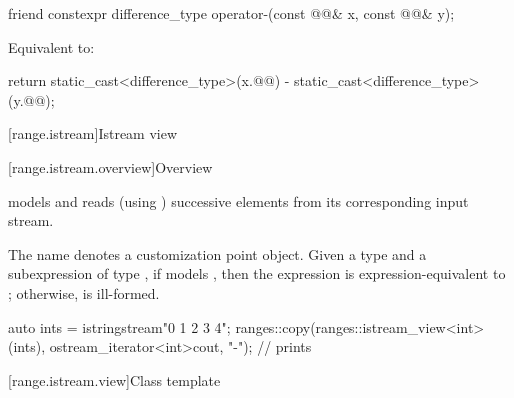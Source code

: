%
\begin{itemdecl}
friend constexpr difference_type operator-(const @@& x, const @@& y);
\end{itemdecl}

\begin{itemdescr}
\pnum
\effects
Equivalent to:
\begin{codeblock}
return static_cast<difference_type>(x.@@) - static_cast<difference_type>(y.@@);
\end{codeblock}
\end{itemdescr}

[range.istream]{Istream view}

[range.istream.overview]{Overview}

\pnum
{} models  and
reads (using ) successive elements
from its corresponding input stream.

\pnum
The name  denotes
a customization point object.
Given a type  and a subexpression  of type ,
if  models
,
then the expression  is expression-equivalent to
;
otherwise,  is ill-formed.

\pnum
\begin{example}
\begin{codeblock}
auto ints = istringstream{"0 1  2   3     4"};
ranges::copy(ranges::istream_view<int>(ints), ostream_iterator<int>{cout, "-"});
// prints 
\end{codeblock}
\end{example}

[range.istream.view]{Class template }

